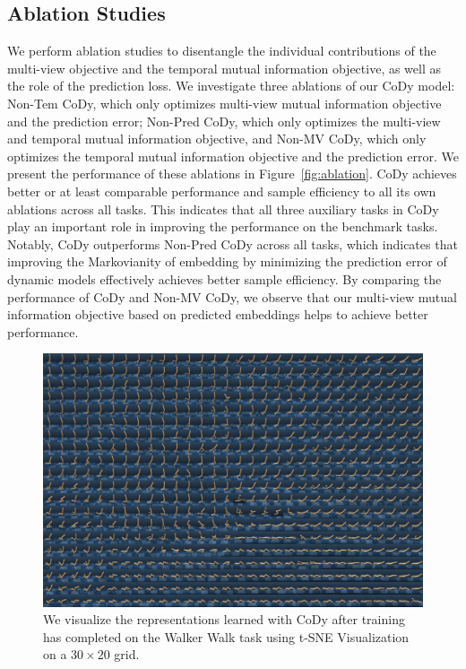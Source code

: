 \documentclass[a4paper,12pt]{article}
\begin{document}
\subsection{Ablation Studies}
We perform ablation studies to disentangle the individual contributions of the multi-view objective and the temporal mutual information objective, as well as the role of the prediction loss. We investigate three ablations of our CoDy model: Non-Tem CoDy, which only optimizes multi-view mutual information objective and the prediction error; Non-Pred CoDy, which only optimizes the multi-view and temporal mutual information objective, and Non-MV CoDy, which only optimizes the temporal mutual information objective and the prediction error. We present the performance of these ablations in Figure~\ref{fig:ablation}. CoDy achieves better or at least comparable performance and sample efficiency to all its own ablations across all tasks. This indicates that all three auxiliary tasks in CoDy play an important role in improving the performance on the benchmark tasks. Notably, CoDy outperforms Non-Pred CoDy across all tasks, which indicates that improving the Markovianity of embedding by minimizing the prediction error of dynamic models effectively achieves better sample efficiency. By comparing the performance of CoDy and Non-MV CoDy, we observe that our multi-view mutual information objective based on predicted embeddings helps to achieve better performance.


\begin{figure}[t]
\centering
\includegraphics[width=\textwidth]{vis.pdf}
\caption{We visualize the representations learned with CoDy after training has completed on the Walker Walk task using t-SNE Visualization on a $30 \times 20$ grid.}
\label{fig:tsne}
\end{figure}
\end{document}
